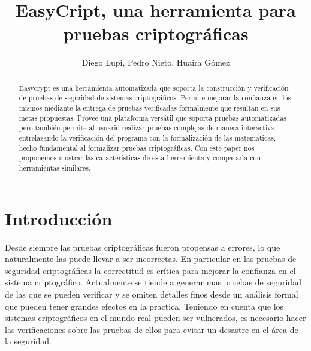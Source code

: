 \documentclass[runningheads]{llncs}
\begin{document}
\title{EasyCript, una herramienta para pruebas criptográficas}

\author{Diego Lupi, Pedro Nieto, Huaira Gómez}


%
%

\maketitle

\begin{abstract}
Easycrypt\cite{ref_article1} es una herramienta automatizada que soporta la construcción y verificación de pruebas de seguridad de sistemas criptográficos. Permite mejorar la confianza en los mismos mediante la entrega de pruebas verificadas formalmente que resultan en sus metas propuestas. Provee una plataforma versátil que soporta pruebas automatizadas pero también permite al usuario realizar pruebas complejas de manera interactiva entrelazando la verificación del programa con la formalización de las matemáticas, hecho fundamental al formalizar pruebas criptográficas. Con este paper nos proponemos mostrar las características de esta herramienta y compararla con herramientas similares.

\end{abstract}
%
%
%
\section{Introducción}
Desde siempre las pruebas criptográficas fueron propensas a errores, lo que naturalmente las puede llevar a ser incorrectas.
 En particular en las pruebas de seguridad criptográficas la correctitud es crítica para mejorar la confianza en el sistema criptográfico. Actualmente se tiende a generar mas pruebas de seguridad de las que se pueden verificar y se omiten detalles finos desde un análisis formal que pueden tener grandes efectos en la practica. Teniendo en cuenta que los sistemas criptográficos en el mundo real pueden ser vulnerados, es necesario hacer las verificaciones sobre las pruebas de ellos para evitar un desastre en el área de la seguridad.
\end{document}
